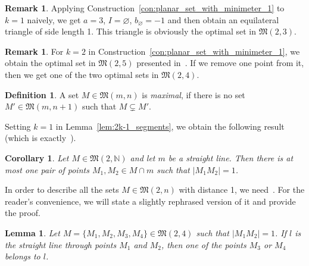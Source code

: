 \documentclass[a4paper,14pt]{article} %
\theoremstyle{plain}
\newtheorem{lemma}[theorem]{Lemma}
\newtheorem{corollary}[theorem]{Corollary}
\theoremstyle{definition}
\newtheorem{definition}[theorem]{Definition}
\newtheorem{remark}[theorem]{Remark}
\begin{document}
\begin{remark}
	\label{rem:planar_set_with_minimeter_1_of_3_points}
	Applying Construction~\ref{con:planar_set_with_minimeter_1} to $k=1$ naively,
	we get $a = 3$, $I=\varnothing$, $b_\varnothing = -1$ and then
	obtain an equilateral triangle of side length 1.
	This triangle is obviously the optimal set in $\mathfrak{M}(2,3)$.
\end{remark}

\begin{remark}
	\label{rem:planar_set_with_minimeter_1_of_4_and_5_points}
	For $k=2$ in Construction~\ref{con:planar_set_with_minimeter_1},
	we obtain the optimal set in $\mathfrak{M}(2,5)$ presented in~\cite[Fig. 1]{harborth1993upper}.
	If we remove one point from it,
	then we get one of the two optimal sets in $\mathfrak{M}(2,4)$.
\end{remark}



\begin{definition}
	\cite{antonov2008maximal}
	A set $M\in \mathfrak{M}(m,n)$ is \textit{maximal},
	if there is no set $M'\in \mathfrak{M}(m,n+1)$
	such that $M \subsetneq M'$.
\end{definition}




Setting $k=1$ in Lemma~\ref{lem:2k-1_segments},
we obtain the following result (which is exactly~\cite[Lemma 3]{our-vmmsh-2018}).
\begin{corollary}
	\label{cor:only_one_distance_1_on_straight_line}
	Let $M \in \mathfrak{M}(2,\mathbb{N})$ and let $m$ be a straight line.
	Then there is at most one pair of points $M_1,M_2\in M \cap m$
	such that $|M_1 M_2| = 1$.
\end{corollary}

In order to describe all the sets $M \in \mathfrak{M}(2,n)$ with distance 1,
we need~\cite[Proposition 6]{our-vmmsh-2018}.
For the reader's convenience, we will state a slightly rephrased version of it and provide the proof.
\begin{lemma}
	\label{lem:no_4_points_in_semigeneral_position_with_distance_1}
	Let $M=\{M_1,M_2,M_3,M_4\}\in \mathfrak{M}(2,4)$ such that $|M_1 M_2|=1$.
	If $l$ is the straight line through points $M_1$ and $M_2$,
	then one of the points $M_3$ or $M_4$ belongs to $l$.
\end{lemma}
\end{document}

